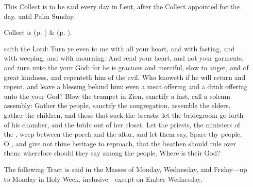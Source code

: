 \begin{rubric}
This Collect is to be said every day in Lent, after the Collect appointed for the day, until Palm Sunday.
\end{rubric}
\begin{rubric}
     Collect is  (p. \pageref{SPSaints}) \&   (p. \pageref{SPLivingDeparted}).
\end{rubric}
 saith the Lord: Turn ye even to me with all your heart, and with fasting, and with weeping, and with mourning: And rend your heart, and not your garments, and turn unto the  your God: for he is gracious and merciful, slow to anger, and of great kindness, and repenteth him of the evil. Who knoweth if he will return and repent, and leave a blessing behind him; even a meat offering and a drink offering unto the  your God? Blow the trumpet in Zion, sanctify a fast, call a solemn assembly: Gather the people, sanctify the congregation, assemble the elders, gather the children, and those that suck the breasts: let the bridegroom go forth of his chamber, and the bride out of her closet. Let the priests, the ministers of the , weep between the porch and the altar, and let them say, Spare thy people, O , and give not thine heritage to reproach, that the heathen should rule over them: wherefore should they say among the people, Where is their God?

\begin{rubric}
    The following Tract is said in the Masses of Monday, Wednesday, and Friday---up to Monday in Holy Week, inclusive---except on Ember Wednesday.
\end{rubric}

